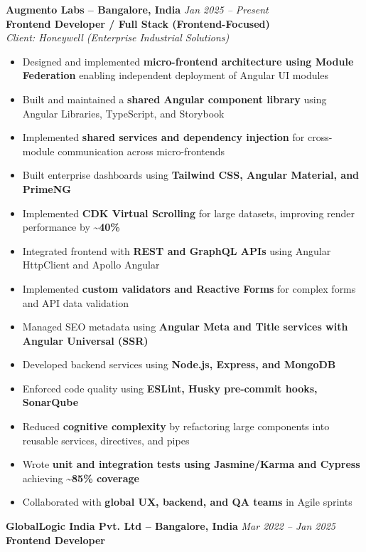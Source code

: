 \documentclass[11pt,a4paper]{article}
\begin{document}
\textbf{Augmento Labs -- Bangalore, India} \hfill \textit{Jan 2025 -- Present} \\
\textbf{Frontend Developer / Full Stack (Frontend-Focused)} \\
\textit{Client: Honeywell (Enterprise Industrial Solutions)}
\begin{itemize}[leftmargin=*]
\item Designed and implemented \textbf{micro-frontend architecture using Module Federation} enabling independent deployment of Angular UI modules
\item Built and maintained a \textbf{shared Angular component library} using Angular Libraries, TypeScript, and Storybook
\item Implemented \textbf{shared services and dependency injection} for cross-module communication across micro-frontends
\item Built enterprise dashboards using \textbf{Tailwind CSS, Angular Material, and PrimeNG}
\item Implemented \textbf{CDK Virtual Scrolling} for large datasets, improving render performance by \textbf{\textasciitilde40\%}
\item Integrated frontend with \textbf{REST and GraphQL APIs} using Angular HttpClient and Apollo Angular
\item Implemented \textbf{custom validators and Reactive Forms} for complex forms and API data validation
\item Managed SEO metadata using \textbf{Angular Meta and Title services with Angular Universal (SSR)}
\item Developed backend services using \textbf{Node.js, Express, and MongoDB}
\item Enforced code quality using \textbf{ESLint, Husky pre-commit hooks, SonarQube}
\item Reduced \textbf{cognitive complexity} by refactoring large components into reusable services, directives, and pipes
\item Wrote \textbf{unit and integration tests using Jasmine/Karma and Cypress} achieving \textbf{\textasciitilde85\% coverage}
\item Collaborated with \textbf{global UX, backend, and QA teams} in Agile sprints
\end{itemize}

\vspace{6pt}

\textbf{GlobalLogic India Pvt. Ltd -- Bangalore, India} \hfill \textit{Mar 2022 -- Jan 2025} \\
\textbf{Frontend Developer}
\end{document}
